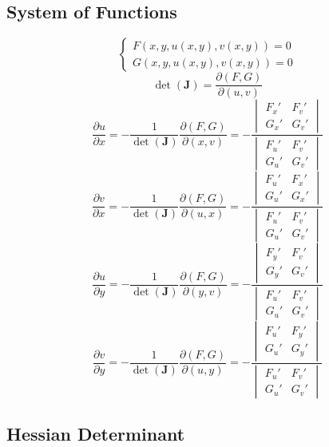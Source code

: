 \documentclass{article}
\begin{document}
\subsection{System of Functions}

\[
    \begin{cases}
        F(x, y, u(x, y), v(x, y)) = 0 \\
        G(x, y, u(x, y), v(x, y)) = 0
    \end{cases}
\]
\[
    \det(\mathbf{J}) = \frac{\partial(F, G)}{\partial(u, v)}
\]
\[
    \frac{\partial u}{\partial x} = -\frac{1}{\det(\mathbf{J})} \frac{\partial(F, G)}{\partial(x, v)} = -\frac{\begin{vmatrix} F_x' & F_v' \\ G_x' & G_v' \end{vmatrix}}{\begin{vmatrix} F_u' & F_v' \\ G_u' & G_v' \end{vmatrix}}
\]
\[
    \frac{\partial v}{\partial x} = -\frac{1}{\det(\mathbf{J})} \frac{\partial(F, G)}{\partial(u, x)} = -\frac{\begin{vmatrix} F_u' & F_x' \\ G_u' & G_x' \end{vmatrix}}{\begin{vmatrix} F_u' & F_v' \\ G_u' & G_v' \end{vmatrix}}
\]
\[
    \frac{\partial u}{\partial y} = -\frac{1}{\det(\mathbf{J})} \frac{\partial(F, G)}{\partial(y, v)} = -\frac{\begin{vmatrix} F_y' & F_v' \\ G_y' & G_v' \end{vmatrix}}{\begin{vmatrix} F_u' & F_v' \\ G_u' & G_v' \end{vmatrix}}
\]
\[
    \frac{\partial v}{\partial y} = -\frac{1}{\det(\mathbf{J})} \frac{\partial(F, G)}{\partial(u, y)} = -\frac{\begin{vmatrix} F_u' & F_y' \\ G_u' & G_y' \end{vmatrix}}{\begin{vmatrix} F_u' & F_v' \\ G_u' & G_v' \end{vmatrix}}
\]

\subsection{Hessian Determinant}
\end{document}
